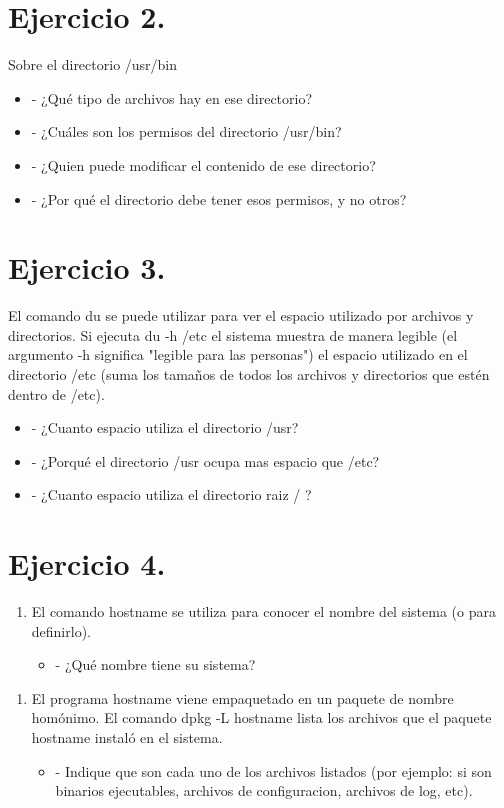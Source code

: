 \documentclass[12pt]{article}
\begin{document}
\section{Ejercicio 2.}
Sobre el directorio /usr/bin

\begin{itemize}
\item - ¿Qué tipo de archivos hay en ese directorio?
\item - ¿Cuáles son los permisos del directorio /usr/bin?
\item - ¿Quien puede modificar el contenido de ese directorio?
\item - ¿Por qué el directorio debe tener esos permisos, y no otros?
\end{itemize}


\section{Ejercicio 3.}
El comando du se puede utilizar para ver el espacio utilizado por archivos y directorios.
Si ejecuta du -h /etc el sistema muestra de manera legible (el argumento -h significa "legible para las personas")
el espacio utilizado en el directorio /etc (suma los tamaños de todos los archivos y directorios que estén dentro de /etc).

\begin{itemize}
\item - ¿Cuanto espacio utiliza el directorio /usr?
\item - ¿Porqué el directorio /usr ocupa mas espacio que /etc?
\item - ¿Cuanto espacio utiliza el directorio raiz / ?
\end{itemize}


\section{Ejercicio 4.}
\begin{enumerate}
\item El comando hostname se utiliza para conocer el nombre del sistema (o para definirlo).
\begin{itemize}
\item - ¿Qué nombre tiene su sistema?
\end{itemize}
\end{enumerate}

\begin{enumerate}
\item El programa hostname viene empaquetado en un paquete de nombre homónimo.
El comando dpkg -L hostname  lista los archivos que el paquete hostname instaló en el sistema.
\begin{itemize}
\item - Indique que son cada uno de los archivos listados (por ejemplo: si son binarios ejecutables, archivos de configuracion, archivos de log, etc).
\end{itemize}
\end{enumerate}
\end{document}
